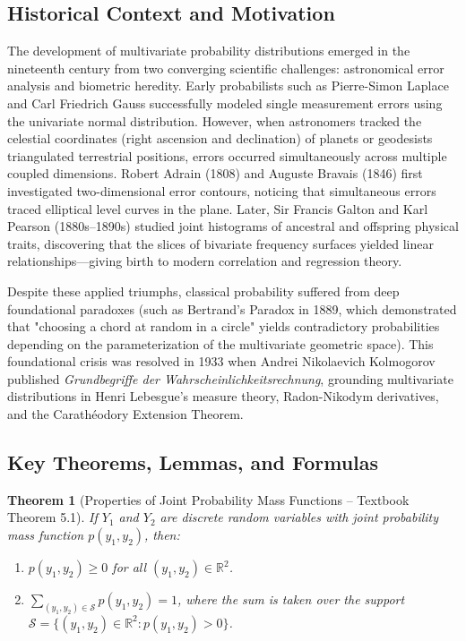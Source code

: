 \documentclass[11pt, letterpaper]{article}
\newtheorem{theorem}{Theorem}[section]
\theoremstyle{definition}
\theoremstyle{remark}
\begin{document}
\subsection{Historical Context and Motivation}

The development of multivariate probability distributions emerged in the nineteenth century from two converging scientific challenges: astronomical error analysis and biometric heredity. Early probabilists such as Pierre-Simon Laplace and Carl Friedrich Gauss successfully modeled single measurement errors using the univariate normal distribution. However, when astronomers tracked the celestial coordinates (right ascension and declination) of planets or geodesists triangulated terrestrial positions, errors occurred simultaneously across multiple coupled dimensions. Robert Adrain (1808) and Auguste Bravais (1846) first investigated two-dimensional error contours, noticing that simultaneous errors traced elliptical level curves in the plane. Later, Sir Francis Galton and Karl Pearson (1880s--1890s) studied joint histograms of ancestral and offspring physical traits, discovering that the slices of bivariate frequency surfaces yielded linear relationships---giving birth to modern correlation and regression theory.

Despite these applied triumphs, classical probability suffered from deep foundational paradoxes (such as Bertrand's Paradox in 1889, which demonstrated that "choosing a chord at random in a circle" yields contradictory probabilities depending on the parameterization of the multivariate geometric space). This foundational crisis was resolved in 1933 when Andrei Nikolaevich Kolmogorov published \emph{Grundbegriffe der Wahrscheinlichkeitsrechnung}, grounding multivariate distributions in Henri Lebesgue's measure theory, Radon-Nikodym derivatives, and the Carath\'eodory Extension Theorem.

\subsection{Key Theorems, Lemmas, and Formulas}

\begin{theorem}[Properties of Joint Probability Mass Functions -- Textbook Theorem 5.1]
If $Y_1$ and $Y_2$ are discrete random variables with joint probability mass function $p(y_1, y_2)$, then:
\begin{enumerate}[label=\arabic*.]
    \item $p(y_1, y_2) \ge 0$ for all $(y_1, y_2) \in \mathbb{R}^2$.
    \item $\displaystyle \sum_{(y_1, y_2) \in \mathcal{S}} p(y_1, y_2) = 1$, where the sum is taken over the support $\mathcal{S} = \{(y_1, y_2) \in \mathbb{R}^2 : p(y_1, y_2) > 0\}$.
\end{enumerate}
\end{theorem}
\end{document}
